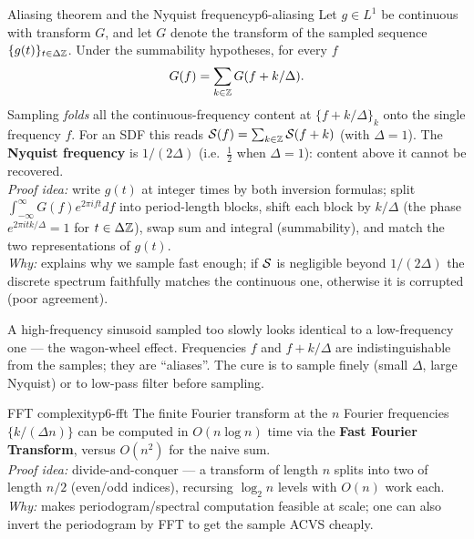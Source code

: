 \begin{theorem}{Aliasing theorem and the Nyquist frequency}{p6-aliasing}
Let $g\in L^1$ be continuous with transform $G$, and let $G$ denote the
transform of the sampled sequence $\{g(t)\}_{t\in\Delta\mathbb{Z}}$. Under the
summability hypotheses, for every $f$
\[
G(f)=\sum_{k\in\mathbb{Z}} G(f+k/\Delta).
\]
Sampling \emph{folds} all the continuous-frequency content at
$\{f+k/\Delta\}_{k}$ onto the single frequency $f$. For an SDF this reads
$\mathcal{S}(f)=\sum_{k\in\mathbb{Z}}\mathcal{S}(f+k)$ (with $\Delta=1$). The
\textbf{Nyquist frequency} is $1/(2\Delta)$ (i.e.\ $\tfrac12$ when
$\Delta=1$): content above it cannot be recovered.\\[2pt]
\textit{Proof idea:} write $g(t)$ at integer times by both inversion formulas;
split $\int_{-\infty}^{\infty}G(f)e^{2\pi i f t}df$ into period-length blocks,
shift each block by $k/\Delta$ (the phase $e^{2\pi i t k/\Delta}=1$ for
$t\in\Delta\mathbb{Z}$), swap sum and integral (summability), and match the two
representations of $g(t)$.\\
\textit{Why:} explains why we sample fast enough; if $\mathcal{S}$ is negligible
beyond $1/(2\Delta)$ the discrete spectrum faithfully matches the continuous
one, otherwise it is corrupted (poor agreement).
\end{theorem}

\begin{intuition}
A high-frequency sinusoid sampled too slowly looks identical to a
low-frequency one --- the wagon-wheel effect. Frequencies $f$ and $f+k/\Delta$
are indistinguishable from the samples; they are ``aliases''. The cure is to
sample finely (small $\Delta$, large Nyquist) or to low-pass filter before
sampling.
\end{intuition}

\begin{proposition}{FFT complexity}{p6-fft}
The finite Fourier transform at the $n$ Fourier frequencies $\{k/(\Delta n)\}$
can be computed in $O(n\log n)$ time via the \textbf{Fast Fourier Transform},
versus $O(n^2)$ for the naive sum.\\[2pt]
\textit{Proof idea:} divide-and-conquer --- a transform of length $n$ splits
into two of length $n/2$ (even/odd indices), recursing $\log_2 n$ levels with
$O(n)$ work each.\\
\textit{Why:} makes periodogram/spectral computation feasible at scale; one
can also invert the periodogram by FFT to get the sample ACVS cheaply.
\end{proposition}

